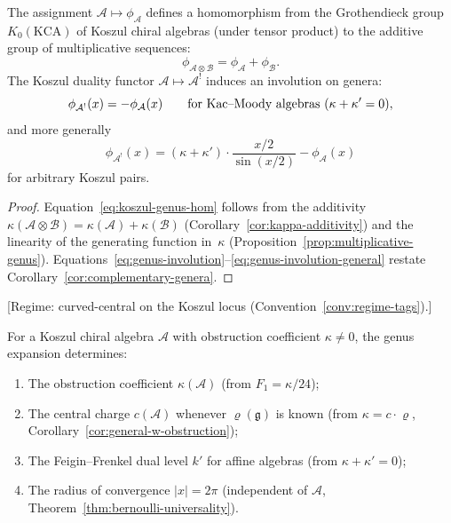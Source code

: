 \begin{proposition}
\label{prop:koszul-genus-involution}
The assignment $\mathcal{A} \mapsto \phi_{\mathcal{A}}$ defines a homomorphism
from the Grothendieck group $K_0(\mathrm{KCA})$ of Koszul chiral algebras
\textup{(}under tensor product\textup{)} to the additive group of multiplicative
sequences:
\begin{equation}\label{eq:koszul-genus-hom}
\phi_{\mathcal{A} \otimes \mathcal{B}} = \phi_{\mathcal{A}} + \phi_{\mathcal{B}}.
\end{equation}
The Koszul duality functor $\mathcal{A} \mapsto \mathcal{A}^!$ induces an
involution on genera:
\begin{equation}\label{eq:genus-involution}
\phi_{\mathcal{A}^!}(x) = -\phi_{\mathcal{A}}(x)
\qquad\text{for Kac--Moody algebras \textup{(}$\kappa + \kappa' = 0$\textup{)}},
\end{equation}
and more generally
\begin{equation}\label{eq:genus-involution-general}
\phi_{\mathcal{A}^!}(x) = (\kappa + \kappa') \cdot \frac{x/2}{\sin(x/2)} - \phi_{\mathcal{A}}(x)
\end{equation}
for arbitrary Koszul pairs.
\end{proposition}

\begin{proof}
Equation~\eqref{eq:koszul-genus-hom} follows from the additivity
$\kappa(\mathcal{A} \otimes \mathcal{B}) = \kappa(\mathcal{A}) + \kappa(\mathcal{B})$
(Corollary~\ref{cor:kappa-additivity}) and the linearity of the generating
function in~$\kappa$ (Proposition~\ref{prop:multiplicative-genus}).
Equations~\eqref{eq:genus-involution}--\eqref{eq:genus-involution-general}
restate Corollary~\ref{cor:complementary-genera}.
\end{proof}

\begin{theorem}
\label{thm:genus-determines-pair}
\textup{[Regime: curved-central on the Koszul locus
\textup{(}Convention~\textup{\ref{conv:regime-tags})}.]}

For a Koszul chiral algebra $\mathcal{A}$ with obstruction coefficient
$\kappa \neq 0$, the genus expansion determines:
\begin{enumerate}[label=\textup{(\roman*)}]
\item The obstruction coefficient $\kappa(\mathcal{A})$
\textup{(}from $F_1 = \kappa/24$\textup{)};
\item The central charge $c(\mathcal{A})$ whenever $\varrho(\mathfrak{g})$ is
known \textup{(}from $\kappa = c \cdot \varrho$,
Corollary~\textup{\ref{cor:general-w-obstruction})};
\item The Feigin--Frenkel dual level $k'$ for affine algebras
\textup{(}from $\kappa + \kappa' = 0$\textup{)};
\item The radius of convergence $|x| = 2\pi$
\textup{(}independent of $\mathcal{A}$,
Theorem~\textup{\ref{thm:bernoulli-universality})}.
\end{enumerate}
\end{theorem}

